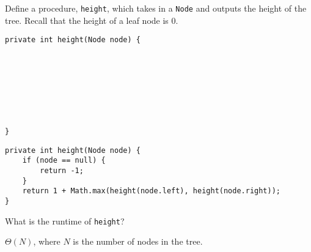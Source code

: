 \question Define a procedure, \texttt{height}, which takes in a \texttt{Node} and outputs the height of the tree. Recall that the height of a leaf node is 0.

\ifprintanswers
\else
\begin{lstlisting}
private int height(Node node) {








}
\end{lstlisting}
\fi

\begin{solution}
\begin{lstlisting}
private int height(Node node) {
    if (node == null) {
        return -1;
    }
    return 1 + Math.max(height(node.left), height(node.right));
}
\end{lstlisting}
\end{solution}

What is the runtime of \texttt{height}?
\begin{solution}[0.25in]
$\Theta(N)$, where $N$ is the number of nodes in the tree.
\end{solution}